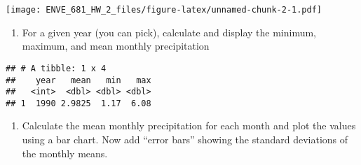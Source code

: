 \documentclass[]{article}
\newenvironment{Shaded}{\begin{snugshade}}{\end{snugshade}}
\newcommand{\KeywordTok}[1]{\textcolor[rgb]{0.13,0.29,0.53}{\textbf{#1}}}
\newcommand{\DataTypeTok}[1]{\textcolor[rgb]{0.13,0.29,0.53}{#1}}
\newcommand{\DecValTok}[1]{\textcolor[rgb]{0.00,0.00,0.81}{#1}}
\newcommand{\StringTok}[1]{\textcolor[rgb]{0.31,0.60,0.02}{#1}}
\newcommand{\OperatorTok}[1]{\textcolor[rgb]{0.81,0.36,0.00}{\textbf{#1}}}
\newcommand{\NormalTok}[1]{#1}
\providecommand{\tightlist}{%
  \setlength{\itemsep}{0pt}\setlength{\parskip}{0pt}}
\begin{document}
\texttt{[image: ENVE\_681\_HW\_2\_files/figure-latex/unnamed-chunk-2-1.pdf]}

\begin{enumerate}
\def\labelenumi{\arabic{enumi}.}
\setcounter{enumi}{2}
\tightlist
\item
  For a given year (you can pick), calculate and display the minimum,
  maximum, and mean monthly precipitation
\end{enumerate}

\begin{Shaded}
\end{Shaded}

\begin{verbatim}
## # A tibble: 1 x 4
##    year   mean   min   max
##   <int>  <dbl> <dbl> <dbl>
## 1  1990 2.9825  1.17  6.08
\end{verbatim}

\begin{enumerate}
\def\labelenumi{\arabic{enumi}.}
\setcounter{enumi}{3}
\tightlist
\item
  Calculate the mean monthly precipitation for each month and plot the
  values using a bar chart. Now add ``error bars'' showing the standard
  deviations of the monthly means.
\end{enumerate}
\end{document}
